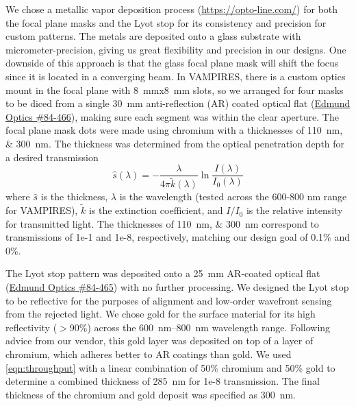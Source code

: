 \documentclass[]{spie}  %
\begin{document}
We chose a metallic vapor deposition process (\url{https://opto-line.com/}) for both the focal plane masks and the Lyot stop for its consistency and precision for custom patterns. The metals are deposited onto a glass substrate with micrometer-precision, giving us great flexibility and precision in our designs. One downside of this approach is that the glass focal plane mask will shift the focus since it is located in a converging beam. In VAMPIRES, there is a custom optics mount in the focal plane with \qty{8}{\milli\meter}x\qty{8}{\milli\meter} slots, so we arranged for four masks to be diced from a single \qty{30}{\milli\meter} anti-reflection (AR) coated optical flat (\href{https://www.edmundoptics.com/p/30mm-dia-4mm-thick-nir-i-coated-lambda10-fused-silica-window/27562/}{Edmund Optics \#84-466}), making sure each segment was within the clear aperture. The focal plane mask dots were made using chromium with a thicknesses of \qtylist{110;300}{\nano\meter}. The thickness was determined from the optical penetration depth for a desired transmission
\begin{equation}
    \hat{s}(\lambda) = -\frac{\lambda}{4\pi\tilde{k}(\lambda)}\ln{\frac{I(\lambda)}{I_0(\lambda)}}
    \label{eqn:throughput}
\end{equation}
where $\hat{s}$ is the thickness, $\lambda$ is the wavelength (tested across the 600-800 nm range for VAMPIRES), $\tilde{k}$ is the extinction coefficient, and $I/I_0$ is the relative intensity for transmitted light. The thicknesses of \qtylist{110;300}{\nano\meter} correspond to transmissions of 1e-1 and 1e-8, respectively, matching our design goal of 0.1\% and 0\%. 

The Lyot stop pattern was deposited onto a \qty{25}{\milli\meter} AR-coated optical flat (\href{https://www.edmundoptics.com/p/25mm-dia-3mm-thick-nir-i-coated-lambda10-fused-silica-window/27561/}{Edmund Optics \#84-465}) with no further processing. We designed the Lyot stop to be reflective for the purposes of alignment and low-order wavefront sensing from the rejected light. We chose gold for the surface material for its high reflectivity ($>$90\%) across the \qtyrange{600}{800}{\nano\meter} wavelength range. Following advice from our vendor, this gold layer was deposited on top of a layer of chromium, which adheres better to AR coatings than gold. We used \autoref{eqn:throughput} with a linear combination of 50\% chromium and 50\% gold to determine a combined thickness of \qty{285}{\nano\meter} for 1e-8 transmission. The final thickness of the chromium and gold deposit was specified as \qty{300}{\nano\meter}.
\end{document}

